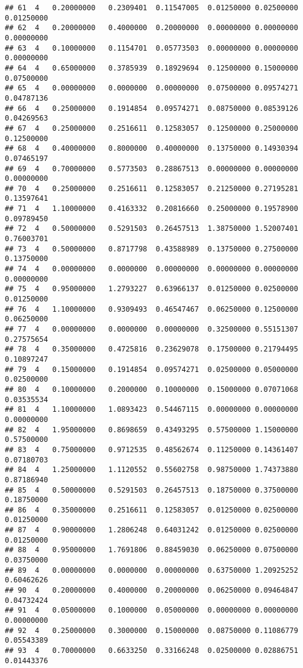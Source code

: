 \documentclass[
]{article}
\begin{document}
\begin{verbatim}
## 61  4   0.20000000   0.2309401  0.11547005  0.01250000 0.02500000 0.01250000
## 62  4   0.20000000   0.4000000  0.20000000  0.00000000 0.00000000 0.00000000
## 63  4   0.10000000   0.1154701  0.05773503  0.00000000 0.00000000 0.00000000
## 64  4   0.65000000   0.3785939  0.18929694  0.12500000 0.15000000 0.07500000
## 65  4   0.00000000   0.0000000  0.00000000  0.07500000 0.09574271 0.04787136
## 66  4   0.25000000   0.1914854  0.09574271  0.08750000 0.08539126 0.04269563
## 67  4   0.25000000   0.2516611  0.12583057  0.12500000 0.25000000 0.12500000
## 68  4   0.40000000   0.8000000  0.40000000  0.13750000 0.14930394 0.07465197
## 69  4   0.70000000   0.5773503  0.28867513  0.00000000 0.00000000 0.00000000
## 70  4   0.25000000   0.2516611  0.12583057  0.21250000 0.27195281 0.13597641
## 71  4   1.10000000   0.4163332  0.20816660  0.25000000 0.19578900 0.09789450
## 72  4   0.50000000   0.5291503  0.26457513  1.38750000 1.52007401 0.76003701
## 73  4   0.50000000   0.8717798  0.43588989  0.13750000 0.27500000 0.13750000
## 74  4   0.00000000   0.0000000  0.00000000  0.00000000 0.00000000 0.00000000
## 75  4   0.95000000   1.2793227  0.63966137  0.01250000 0.02500000 0.01250000
## 76  4   1.10000000   0.9309493  0.46547467  0.06250000 0.12500000 0.06250000
## 77  4   0.00000000   0.0000000  0.00000000  0.32500000 0.55151307 0.27575654
## 78  4   0.35000000   0.4725816  0.23629078  0.17500000 0.21794495 0.10897247
## 79  4   0.15000000   0.1914854  0.09574271  0.02500000 0.05000000 0.02500000
## 80  4   0.10000000   0.2000000  0.10000000  0.15000000 0.07071068 0.03535534
## 81  4   1.10000000   1.0893423  0.54467115  0.00000000 0.00000000 0.00000000
## 82  4   1.95000000   0.8698659  0.43493295  0.57500000 1.15000000 0.57500000
## 83  4   0.75000000   0.9712535  0.48562674  0.11250000 0.14361407 0.07180703
## 84  4   1.25000000   1.1120552  0.55602758  0.98750000 1.74373880 0.87186940
## 85  4   0.50000000   0.5291503  0.26457513  0.18750000 0.37500000 0.18750000
## 86  4   0.35000000   0.2516611  0.12583057  0.01250000 0.02500000 0.01250000
## 87  4   0.90000000   1.2806248  0.64031242  0.01250000 0.02500000 0.01250000
## 88  4   0.95000000   1.7691806  0.88459030  0.06250000 0.07500000 0.03750000
## 89  4   0.00000000   0.0000000  0.00000000  0.63750000 1.20925252 0.60462626
## 90  4   0.20000000   0.4000000  0.20000000  0.06250000 0.09464847 0.04732424
## 91  4   0.05000000   0.1000000  0.05000000  0.00000000 0.00000000 0.00000000
## 92  4   0.25000000   0.3000000  0.15000000  0.08750000 0.11086779 0.05543389
## 93  4   0.70000000   0.6633250  0.33166248  0.02500000 0.02886751 0.01443376

\end{verbatim}
\end{document}
